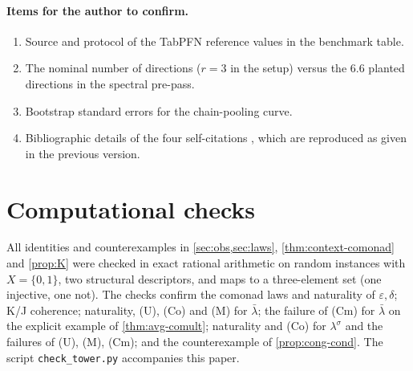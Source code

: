 \documentclass[11pt]{article}
\theoremstyle{definition}
\theoremstyle{remark}
\newcommand{\lb}{\bar\lambda}
\newcommand{\ls}{\lambda^{\sigma}}
\begin{document}
\paragraph{Items for the author to confirm.}
\begin{enumerate}[leftmargin=*,resume]
\item\label{it:tabpfn} Source and protocol of the TabPFN reference values in the benchmark table.
\item The nominal number of directions ($r=3$ in the setup) versus the $6.6$ planted directions in
  the spectral pre-pass.
\item Bootstrap standard errors for the chain-pooling curve.
\item Bibliographic details of the four self-citations
  \cite{Awasthi-CausalIDView,Awasthi-Hierarchy,Awasthi-Holonomy,Awasthi-ThreeLayers}, which are
  reproduced as given in the previous version.
\end{enumerate}

\section{Computational checks}

All identities and counterexamples in \cref{sec:obs,sec:laws}, \cref{thm:context-comonad} and
\cref{prop:K} were checked in exact rational arithmetic on random instances with $X=\{0,1\}$, two
structural descriptors, and maps to a three-element set (one injective, one not). The checks confirm
the comonad laws and naturality of $\varepsilon,\delta$; K/J coherence; naturality, (U), (Co) and (M)
for $\lb$; the failure of (Cm) for $\lb$ on the explicit example of \cref{thm:avg-comult}; naturality
and (Co) for $\ls$ and the failures of (U), (M), (Cm); and the counterexample of
\cref{prop:cong-cond}. The script \texttt{check\_tower.py} accompanies this paper.
\end{document}
